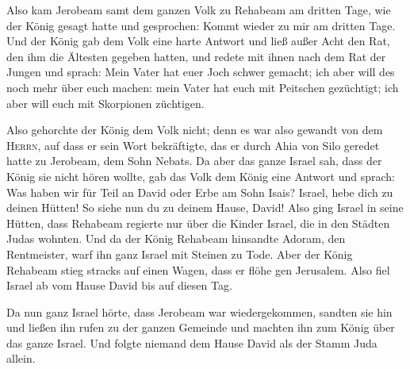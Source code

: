  Also kam Jerobeam samt dem ganzen Volk zu Rehabeam am
dritten Tage, wie der König gesagt hatte und gesprochen: Kommt wieder zu
mir am dritten Tage.  Und der König gab dem Volk eine
harte Antwort und ließ außer Acht den Rat, den ihm die Ältesten gegeben
hatten,  und redete mit ihnen nach dem Rat der Jungen und
sprach: Mein Vater hat euer Joch schwer gemacht; ich aber will des noch
mehr über euch machen: mein Vater hat euch mit Peitschen gezüchtigt; ich
aber will euch mit Skorpionen züchtigen.

 Also gehorchte der König dem Volk nicht; denn es war
also gewandt von dem \textsc{Herrn}, auf dass er sein Wort bekräftigte,
das er durch Ahia von Silo geredet hatte zu Jerobeam, dem Sohn Nebats.
 Da aber das ganze Israel sah, dass der König sie nicht
hören wollte, gab das Volk dem König eine Antwort und sprach: Was haben
wir für Teil an David oder Erbe am Sohn Isais? Israel, hebe dich zu
deinen Hütten! So siehe nun du zu deinem Hause, David! Also ging Israel
in seine Hütten,  dass Rehabeam regierte nur über die
Kinder Israel, die in den Städten Judas wohnten.  Und da
der König Rehabeam hinsandte Adoram, den Rentmeister, warf ihn ganz
Israel mit Steinen zu Tode. Aber der König Rehabeam stieg stracks auf
einen Wagen, dass er flöhe gen Jerusalem.  Also fiel
Israel ab vom Hause David bis auf diesen Tag.

 Da nun ganz Israel hörte, dass Jerobeam war
wiedergekommen, sandten sie hin und ließen ihn rufen zu der ganzen
Gemeinde und machten ihn zum König über das ganze Israel. Und folgte
niemand dem Hause David als der Stamm Juda allein.

